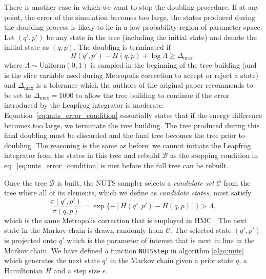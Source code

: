 There is another case in which we want to stop the doubling procedure. If at any point, the error of the simulation becomes too large,
the states produced during the doubling process is likely to lie in a low probability region of parameter space. Let $(q', p')$ be any state in the tree (including the initial state) and denote the initial state as $(q, p)$. The doubling is terminated if
\begin{equation}\label{eq:nuts_error_condition}
    H(q', p') - H(q, p) + \log \Lambda \geq \Delta_\text{max},
\end{equation}
where $\Lambda \sim \text{Uniform}(0, 1)$ is sampled in the beginning of the tree building (and is the slice variable used during Metropolis correction to accept or reject a state) and $\Delta_\text{max}$ is a tolerance which the authors of the original paper recommends to be set to $\Delta_\text{max} = 1000$ to allow the tree building to continue if the error introduced by the Leapfrog integrator is moderate. Equation~\eqref{eq:nuts_error_condition} essentially states that if the energy difference becomes too large, we terminate the tree building. The tree produced during this final doubling must be discarded and the final tree becomes the tree prior to doubling. The reasoning is the same as before; we cannot initiate the Leapfrog integrator from the states in this tree and rebuild $\mathcal{B}$ as the stopping condition in eq.~\eqref{eq:nuts_error_condition} is met before the full tree can be rebuilt.

Once the tree $\mathcal{B}$ is built, the NUTS sampler selects a \textit{candidate set} $\mathcal{C}$ from the tree where all of its elements, which we define as \textit{candidate states}, must satisfy
\begin{equation}\label{eq:nuts_acceptance}
    \frac{\pi(q', p')}{\pi(q, p)} = \exp\{-[H(q', p') - H(q, p) ]\} > \Lambda,
\end{equation}
which is the same Metropolis correction that is employed in HMC \cite{nuts_joonha_park}. The next state in the Markov chain is drawn randomly from $\mathcal{C}$. The selected state $(q', p')$ is projected onto $q'$ which is the parameter of interest that is next in line in the Markov chain. We have defined a function {\tt NUTSstep} in algorithm \ref{algo:nuts} which generates the next state $q'$ in the Markov chain given a prior state $q$, a Hamiltonian $H$ and a step size $\epsilon$.

